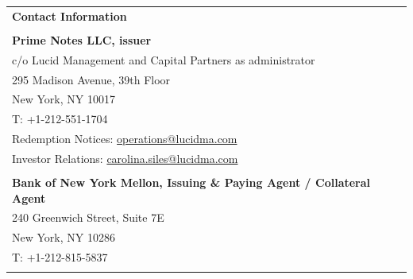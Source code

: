 \documentclass[9pt]{article}
\begin{document}
    \begin{center}
        \noindent\begin{tabular}{p{\textwidth}}
                     \rowcolor{lucid_blue}
                     {\color[HTML]{FFFFFF} \textbf{Contact Information}}                          \\
                     \rowcolor[HTML]{EFEFEF}
                     \\
                     \rowcolor[HTML]{EFEFEF}
                     \textbf{Prime Notes LLC, issuer}                   \\
                     \rowcolor[HTML]{EFEFEF}
                     c/o Lucid Management and Capital Partners as administrator                                               \\
                     \rowcolor[HTML]{EFEFEF}
                     295 Madison Avenue, 39th Floor                                                           \\
                     \rowcolor[HTML]{EFEFEF}
                     New York, NY 10017                                                           \\
                     \rowcolor[HTML]{EFEFEF}
                     T: +1-212-551-1704                       \\
                     \rowcolor[HTML]{EFEFEF}
                     Redemption Notices: \underline{operations@lucidma.com}                   \\
                     \rowcolor[HTML]{EFEFEF}
                     Investor Relations: \underline{carolina.siles@lucidma.com} \\
                     \rowcolor[HTML]{EFEFEF}
                     \\
                     \rowcolor[HTML]{EFEFEF}
                     \textbf{Bank of New York Mellon, Issuing \& Paying Agent / Collateral Agent}                                                           \\
                     \rowcolor[HTML]{EFEFEF}
                     240 Greenwich Street, Suite 7E                                                           \\
                     \rowcolor[HTML]{EFEFEF}
                     New York, NY 10286                                    \\
                     \rowcolor[HTML]{EFEFEF}
                     T: +1-212-815-5837                                     \\
                     \rowcolor[HTML]{EFEFEF}

\end{tabular}
\end{center}
\end{document}
